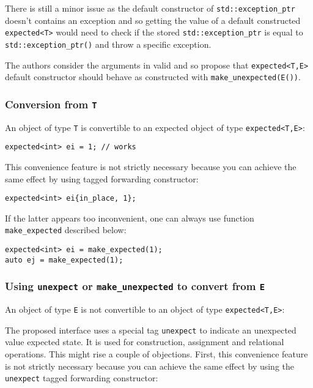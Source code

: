 \documentclass[a4paper,10pt]{article}
\newcommand{\cpp}[1]{\lstinline{#1}}
\begin{document}
There is still a minor issue as the default constructor of \cpp{std::exception_ptr} doesn't contains an exception and so getting the value of a default constructed \cpp{expected<T>} would need to check if the stored \cpp{std::exception_ptr} is equal to \cpp{std::exception_ptr()} and throw a specific exception.

The authors consider the arguments in  \cite{OptionalRev3} valid and so propose that \cpp{expected<T,E>} default constructor should behave as constructed with \cpp{make_unexpected(E())}.

\subsubsection{Conversion from \cpp{T}}

An object of type \cpp{T} is convertible to an expected object of type \cpp{expected<T,E>}:

\begin{lstlisting}
expected<int> ei = 1; // works
\end{lstlisting}

This convenience feature is not strictly necessary because you can achieve the same effect by using tagged forwarding constructor:

\begin{lstlisting}
expected<int> ei{in_place, 1};
\end{lstlisting}

If the latter appears too inconvenient, one can always use function \cpp{make_expected} described below:

\begin{lstlisting}
expected<int> ei = make_expected(1); 
auto ej = make_expected(1); 
\end{lstlisting}

\subsubsection{Using \cpp{unexpect} or \cpp{make_unexpected} to convert from \cpp{E}}

An object of type \cpp{E} is not convertible to an object of type \cpp{expected<T,E>}:

The proposed interface uses a special tag \cpp{unexpect} to indicate an unexpected value expected state. It is used for construction, assignment and relational operations. This might rise a couple of objections. First, this convenience feature is not strictly necessary because you can achieve the same effect by using the \cpp{unexpect} tagged forwarding constructor:
\end{document}
